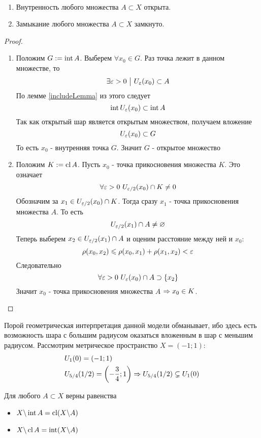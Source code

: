 \begin{theorem}~
	\begin{enumerate}
		\item Внутренность любого множества $A \subset X$ открыта.
		
		\item Замыкание любого множества $A \subset X$ замкнуто.
	\end{enumerate}
\end{theorem}

\begin{proof}~
	\begin{enumerate}
		\item Положим $G := \operatorname{int} A$. Выберем $\forall x_0 \in G$. Раз точка лежит в данном множестве, то
		\[
			\exists \varepsilon > 0 \ \big|\  U_\varepsilon(x_0) \subset A
		\]
		По лемме \ref{includeLemma} из этого следует
		\[
			\operatorname{int} U_\varepsilon(x_0) \subset \operatorname{int} A
		\]
		Так как открытый шар является открытым множеством, получаем вложение
		\[
			U_\varepsilon(x_0) \subset G
		\]
		То есть $x_0$ - внутренняя точка $G$. Значит $G$ - открытое множество
	
		\item Положим $K := \operatorname{cl} A$. Пусть $x_0$ - точка прикосновения множества $K$. Это означает
		\[
			\forall \varepsilon > 0\ U_{\varepsilon / 2}(x_0) \cap K \neq 0
		\]
		Обозначим за $x_1 \in U_{\varepsilon / 2}(x_0) \cap K$. Тогда сразу $x_1$ - точка прикосновения множества $A$. То есть
		\[
			U_{\varepsilon / 2}(x_1) \cap A \neq \varnothing
		\]
		Теперь выберем $x_2 \in U_{\varepsilon / 2}(x_1) \cap A$ и оценим расстояние между ней и $x_0$:
		\[
			\rho(x_0, x_2) \leqslant \rho(x_0, x_1) + \rho(x_1, x_2) < \varepsilon
		\]
		Следовательно
		\[
			\forall \varepsilon > 0\ U_{\varepsilon}(x_0) \cap A \supset \{x_2\}
		\]
		Значит $x_0$ - точка прикосновения множества $A$ $\Rightarrow x_0 \in K$.
	\end{enumerate}
\end{proof}

\begin{example}
	Порой геометрическая интерпретация данной модели обманывает, ибо здесь есть возможность шара с большим радиусом оказаться вложенным в шар с меньшим радиусом. Рассмотрим метрическое пространство $X = (-1; 1)$:
	\begin{align*}
		&{U_{1}(0) = (-1; 1)}
		\\
		&{U_{5/4}(1/2) = \left(-\frac{3}{4}; 1\right) \Rightarrow U_{5/4}(1/2) \subsetneq U_{1}(0)}
	\end{align*}
\end{example}

\begin{lemma}
	Для любого $A \subset X$ верны равенства
	\begin{itemize}
		\item $X \backslash \operatorname{int} A = \operatorname{cl}(X \backslash A)$
		
		\item $X \backslash \operatorname{cl} A = \operatorname{int}(X \backslash A)$
	\end{itemize}
\end{lemma}

